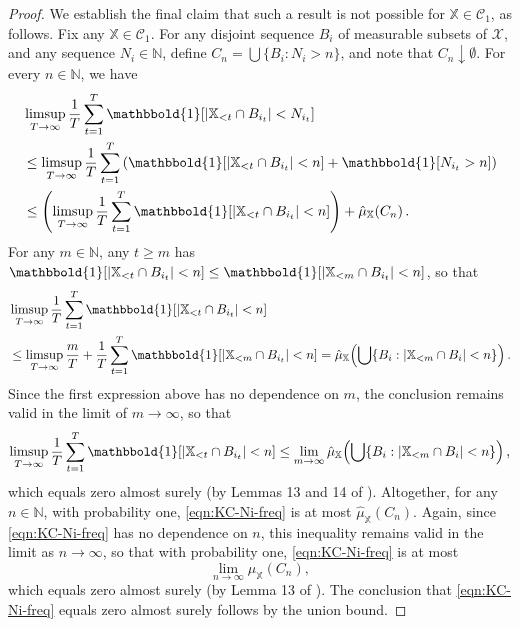 \documentclass[aos]{imsart}
\theoremstyle{plain}
\theoremstyle{remark}
\newcommand{\Xbb}{\mathbb{X}}
\newcommand{\1}{\mathbbm{1}}%
\newcommand{\X}{\mathcal X}
\newcommand{\nats}{\mathbb{N}}
\renewcommand{\limsup}{\mathop{\rm limsup}}
\newcommand{\ind}{\mathbbold{1}}
\newcommand{\ProcX}{\mathbb{X}}
\newcommand{\KC}{\mathcal{C}_{1}}
\begin{document}
\begin{proof}
We establish the final claim that such a result is not possible for $\ProcX \in \KC$, as follows.
Fix any $\ProcX \in \KC$.
For any disjoint sequence $B_i$ of measurable 
subsets of $\X$, and any sequence $N_i \in \nats$,
define $C_n = \bigcup \{ B_i : N_i > n \}$, 
and note that $C_n \downarrow \emptyset$.
For every $n \in \nats$, we have
\begin{align}
& \limsup_{T \to \infty} \frac{1}{T} \sum_{t=1}^{T} \ind\!\left[ \left| \Xbb_{< t} \cap B_{i_t} \right| < N_{i_t} \right] \label{eqn:KC-Ni-freq}
\\ & \leq \limsup_{T \to \infty} \frac{1}{T} \sum_{t=1}^{T} \left( \ind\!\left[ \left| \Xbb_{< t} \cap B_{i_t} \right| < n \right] + \ind\!\left[ N_{i_t} > n \right] \right) \notag 
\\ & \leq \left(  \limsup_{T \to \infty} \frac{1}{T} \sum_{t=1}^{T} \ind\!\left[ \left| \Xbb_{< t} \cap B_{i_t} \right| < n \right] \right) + \hat{\mu}_{\ProcX}\!\left( C_n \right). \notag
\end{align}
For any $m \in \nats$, any $t \geq m$ has 
$\ind\!\left[ \left| \Xbb_{< t} \cap B_{i_t} \right| < n \right] \leq \ind\!\left[ \left| \Xbb_{< m} \cap B_{i_t} \right| < n \right]$, 
so that 
\begin{align*}
& \limsup_{T \to \infty} \frac{1}{T} \sum_{t=1}^{T} \ind\!\left[ \left| \Xbb_{< t} \cap B_{i_t} \right| < n \right]
\\ & \leq \limsup_{T \to \infty} \frac{m}{T} + \frac{1}{T} \sum_{t=1}^{T} \ind\!\left[ \left| \Xbb_{< m} \cap B_{i_t} \right| < n \right]
= \hat{\mu}_{\ProcX}\!\left( \bigcup \{ B_i : |\Xbb_{< m} \cap B_i| < n \}   \right).
\end{align*}
Since the first expression above has no dependence on $m$, 
the conclusion remains valid in the limit of $m \to \infty$, 
so that 
\begin{equation*}
\limsup_{T \to \infty} \frac{1}{T} \sum_{t=1}^{T} \ind\!\left[ \left| \Xbb_{< t} \cap B_{i_t} \right| < n \right]
 \leq \lim_{m \to \infty} \hat{\mu}_{\ProcX}\!\left( \bigcup \{ B_i : |\Xbb_{< m} \cap B_i| < n \} \right),
\end{equation*}
which equals zero almost surely (by Lemmas 13 and 14 of \citealp*{hanneke:21}).
Altogether, for any $n \in \nats$, 
with probability one, 
\eqref{eqn:KC-Ni-freq} is at most
$\hat{\mu}_{\ProcX}\!\left( C_n \right)$.
Again, since \eqref{eqn:KC-Ni-freq} has no dependence on $n$, 
this inequality remains valid in the limit as $n \to \infty$, 
so that with probability one, 
\eqref{eqn:KC-Ni-freq} is at most 
\begin{equation*}
\lim\limits_{n \to \infty} \hat{\mu}_{\ProcX}\!\left( C_n \right),
\end{equation*}
which equals zero almost surely 
(by Lemma 13 of \citealp*{hanneke:21}).
The conclusion that \eqref{eqn:KC-Ni-freq} equals zero almost surely 
follows by the union bound.
\end{proof}
\end{document}
